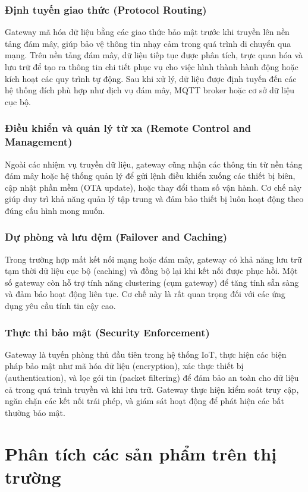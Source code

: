                 \subsubsection*{Định tuyến giao thức (Protocol Routing)}
                    Gateway mã hóa dữ liệu bằng các giao thức bảo mật trước khi truyền lên nền tảng đám mây, giúp bảo vệ thông tin nhạy cảm trong quá trình di chuyển qua mạng. Trên nền tảng đám mây, dữ liệu tiếp tục được phân tích, trực quan hóa và lưu trữ để tạo ra thông tin chi tiết phục vụ cho việc hình thành hành động hoặc kích hoạt các quy trình tự động. Sau khi xử lý, dữ liệu được định tuyến đến các hệ thống đích phù hợp như dịch vụ đám mây, MQTT broker hoặc cơ sở dữ liệu cục bộ. 
                \subsubsection*{Điều khiển và quản lý từ xa (Remote Control and Management)}
                    Ngoài các nhiệm vụ truyền dữ liệu, gateway cũng nhận các thông tin từ nền tảng đám mây hoặc hệ thống quản lý để gửi lệnh điều khiển xuống các thiết bị biên, cập nhật phần mềm (OTA update), hoặc thay đổi tham số vận hành. Cơ chế này giúp duy trì khả năng quản lý tập trung và đảm bảo thiết bị luôn hoạt động theo đúng cấu hình mong muốn.
                \subsubsection*{Dự phòng và lưu đệm (Failover and Caching)}
                    Trong trường hợp mất kết nối mạng hoặc đám mây, gateway có khả năng lưu trữ tạm thời dữ liệu cục bộ (caching) và đồng bộ lại khi kết nối được phục hồi. Một số gateway còn hỗ trợ tính năng clustering (cụm gateway) để tăng tính sẵn sàng và đảm bảo hoạt động liên tục. Cơ chế này là rất quan trọng đối với các ứng dụng yêu cầu tính tin cậy cao.
                \subsubsection*{Thực thi bảo mật (Security Enforcement)}
                    Gateway là tuyến phòng thủ đầu tiên trong hệ thống IoT, thực hiện các biện pháp bảo mật như mã hóa dữ liệu (encryption), xác thực thiết bị (authentication), và lọc gói tin (packet filtering) để đảm bảo an toàn cho dữ liệu cả trong quá trình truyền và khi lưu trữ. Gateway thực hiện kiểm soát truy cập, ngăn chặn các kết nối trái phép, và giám sát hoạt động để phát hiện các bất thường bảo mật.
    \section{Phân tích các sản phẩm trên thị trường}
